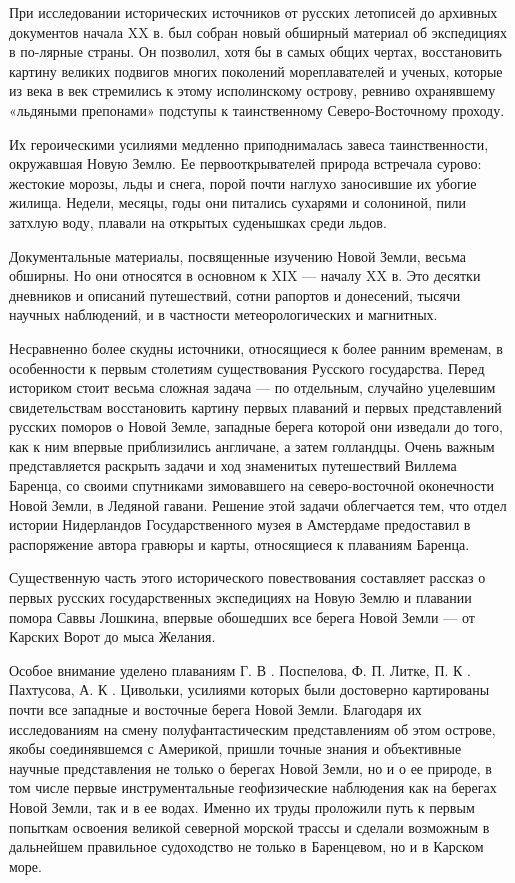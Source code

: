 \documentclass[12pt, a4paper, openany]{book}
\begin{document}
При исследовании исторических источников от русских летописей до архивных документов начала XX в. был собран новый обширный материал об экспедициях в по-лярные страны. Он позволил, хотя бы в самых общих чертах, восстановить картину великих подвигов многих поколений мореплавателей и ученых, которые из века в век стремились к этому исполинскому острову, ревниво охранявшему «льдяными препонами» подступы к таинственному Северо-Восточному проходу. 

Их героическими усилиями медленно приподнималась завеса таинственности, окружавшая Новую Землю. Ее первооткрывателей природа встречала сурово: жестокие морозы, льды и снега, порой почти наглухо заносившие их убогие жилища. Недели, месяцы, годы они питались сухарями и солониной, пили затхлую воду, плавали на 
открытых суденышках среди льдов. 

Документальные материалы, посвященные изучению Новой Земли, весьма обширны. Но они относятся в основном к XIX — началу XX в. Это десятки дневников и описаний путешествий, сотни рапортов и донесений, тысячи научных наблюдений, и в частности метеорологических и магнитных. 

Несравненно более скудны источники, относящиеся к более ранним временам, в особенности к первым столетиям существования Русского государства. Перед историком стоит весьма сложная задача — по отдельным, случайно уцелевшим свидетельствам восстановить картину первых плаваний и первых представлений русских поморов о Новой Земле, западные берега которой они изведали до того, как к ним впервые приблизились англичане, а затем голландцы. Очень важным представляется раскрыть задачи и ход знаменитых путешествий Виллема Баренца, со своими спутниками зимовавшего на северо-восточной оконечности Новой Земли, в Ледяной гавани. Решение этой задачи облегчается тем, что отдел истории Нидерландов Государственного музея в Амстердаме предоставил в распоряжение автора гравюры и карты, относящиеся к плаваниям Баренца. 

Существенную часть этого исторического повествования составляет рассказ о первых русских государственных экспедициях на Новую Землю и плавании помора Саввы Лошкина, впервые обошедших все берега Новой Земли — от Карских Ворот до мыса Желания. 

Особое внимание уделено плаваниям Г. В . Поспелова, Ф. П. Литке, П. К . Пахтусова, А. К . Цивольки, усилиями которых были достоверно картированы почти все западные и восточные берега Новой Земли. Благодаря их исследованиям на смену полуфантастическим представлениям об этом острове, якобы соединявшемся с Америкой, пришли точные знания и объективные научные представления не только о берегах Новой Земли, но и о ее природе, в том числе первые инструментальные геофизические наблюдения как на берегах Новой Земли, так и в ее водах. Именно их труды проложили путь к первым попыткам освоения великой северной морской трассы и сделали возможным в дальнейшем правильное судоходство не только в Баренцевом, но и в Карском море. 
\end{document}
